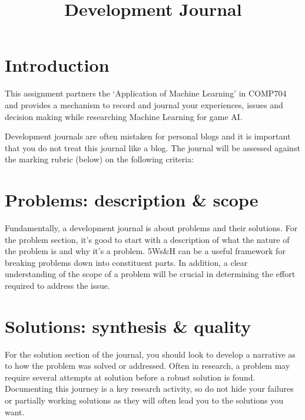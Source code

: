 \documentclass{../common/fal_assignment}
\title{Development Journal}
\begin{document}
\maketitle

\section*{Introduction}

%

This assignment partners the `Application of Machine Learning' in COMP704 and provides a mechanism to record and journal your experiences, issues and decision making while researching Machine Learning for game AI.

Development journals are often mistaken for personal blogs and it is important that you do not treat this journal like a blog. The journal will be assessed against the marking rubric (below) on the following criteria:

\section*{Problems: description \& scope}
Fundamentally, a development journal is about problems and their solutions. For the problem section, it's good to start with a description of what the nature of the problem is and why it's a problem. 5Ws\&H can be a useful framework for breaking problems down into constituent parts. In addition, a clear understanding of the scope of a problem will be crucial in determining the effort required to address the issue.

\section*{Solutions: synthesis \& quality}
For the solution section of the journal, you should look to develop a narrative as to how the problem was solved or addressed. Often in research, a problem may require several attempts at solution before a robust solution is found. Documenting this journey is a key research activity, so do not hide your failures or partially working solutions as they will often lead you to the solutions you want.
\end{document}
